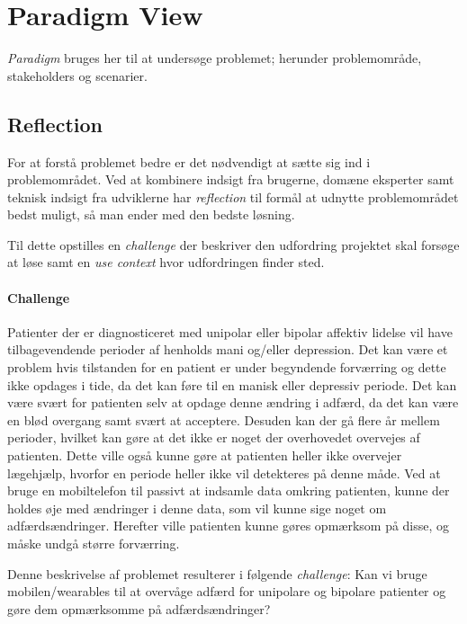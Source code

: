 

\section{Paradigm View}
\textit{Paradigm} bruges her til at undersøge problemet; herunder problemområde, stakeholders og scenarier.

\subsection{Reflection}
For at forstå problemet bedre er det nødvendigt at sætte sig ind i problemområdet.
Ved at kombinere indsigt fra brugerne, domæne eksperter samt teknisk indsigt fra udviklerne har \emph{reflection} til formål at udnytte problemområdet bedst muligt, så man ender med den bedste løsning.

Til dette opstilles en \emph{challenge} der beskriver den udfordring projektet skal forsøge at løse samt en \emph{use context} hvor udfordringen finder sted.

\paragraph{Challenge}
Patienter der er diagnosticeret med unipolar eller bipolar affektiv lidelse vil have tilbagevendende perioder af henholds mani og/eller depression.
Det kan være et problem hvis tilstanden for en patient er under begyndende forværring og dette ikke opdages i tide, da det kan føre til en manisk eller depressiv periode.
Det kan være svært for patienten selv at opdage denne ændring i adfærd, da det kan være en blød overgang samt svært at acceptere.
Desuden kan der gå flere år mellem perioder, hvilket kan gøre at det ikke er noget der overhovedet overvejes af patienten.
Dette ville også kunne gøre at patienten heller ikke overvejer lægehjælp, hvorfor en periode heller ikke vil detekteres på denne måde.
Ved at bruge en mobiltelefon til passivt at indsamle data omkring patienten, kunne der holdes øje med ændringer i denne data, som vil kunne sige noget om adfærdsændringer.
Herefter ville patienten kunne gøres opmærksom på disse, og måske undgå større forværring.

Denne beskrivelse af problemet resulterer i følgende \emph{challenge}:
Kan vi bruge mobilen/wearables til at overvåge adfærd for unipolare og bipolare patienter og gøre dem opmærksomme på adfærdsændringer?

